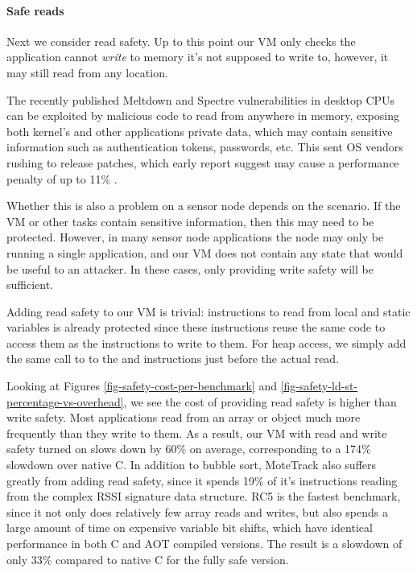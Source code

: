 \paragraph{Safe reads}
Next we consider read safety. Up to this point our VM only checks the application cannot \emph{write} to memory it's not supposed to write to, however, it may still read from any location.

The recently published Meltdown and Spectre vulnerabilities in desktop CPUs can be exploited by malicious code to read from anywhere in memory, exposing both kernel's and other applications private data, which may contain sensitive information such as authentication tokens, passwords, etc. This sent OS vendors rushing to release patches, which early report suggest may cause a performance penalty of up to 11\% \cite{Simakov:2018wp}.

Whether this is also a problem on a sensor node depends on the scenario. If the VM or other tasks contain sensitive information, then this may need to be protected. However, in many sensor node applications the node may only be running a single application, and our VM does not contain any state that would be useful to an attacker. In these cases, only providing write safety will be sufficient.

Adding read safety to our VM is trivial: instructions to read from local and static variables is already protected since these instructions reuse the same code to access them as the instructions to write to them. For heap access, we simply add the same call to  to the  and  instructions just before the actual read.

Looking at Figures \ref{fig-safety-cost-per-benchmark} and \ref{fig-safety-ld-st-percentage-vs-overhead}, we see the cost of providing read safety is higher than write safety. Most applications read from an array or object much more frequently than they write to them. As a result, our VM with read and write safety turned on slows down by 60\% on average, corresponding to a 174\% slowdown over native C. In addition to bubble sort, MoteTrack also suffers greatly from adding read safety, since it spends 19\% of it's instructions reading from the complex RSSI signature data structure. RC5 is the fastest benchmark, since it not only does relatively few array reads and writes, but also spends a large amount of time on expensive variable bit shifts, which have identical performance in both C and AOT compiled versions. The result is a slowdown of only 33\% compared to native C for the fully safe version.

